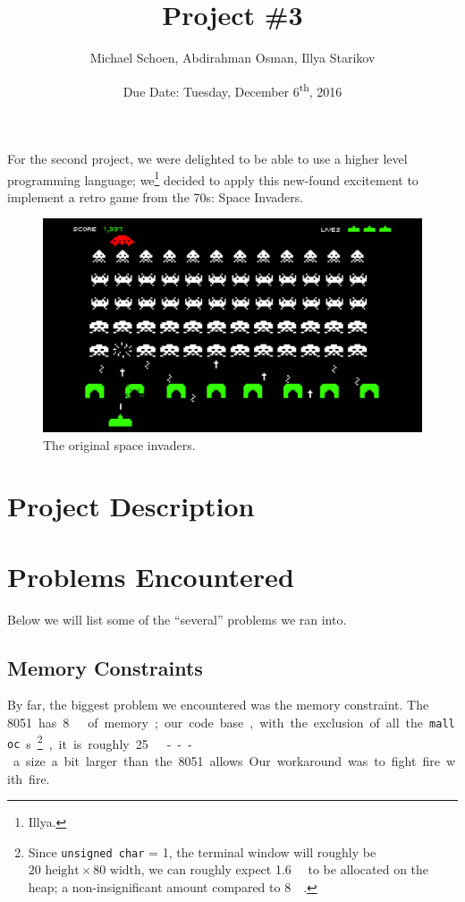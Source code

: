 \documentclass[12pt]{article}
\title{Project \#3}
\date{Due Date: Tuesday, December 6\textsuperscript{th}, 2016}
\author{Michael Schoen, Abdirahman Osman, Illya Starikov}
\newcommand{\shellcmd}[1]{\texttt{\colorbox{gray!30}{#1}}}
\begin{document}
\maketitle

For the second project, we were delighted to be able to use a higher level programming language; we\footnote{Illya.} decided to apply this new-found excitement to implement a retro game from the \num{70}s: Space Invaders.

\begin{figure}[!ht]
    \includegraphics[width=\textwidth]{assets/space-invaders}
    \caption{The original space invaders.}
    \label{space-invaders}
\end{figure}

\section{Project Description}

\section{Problems Encountered}
Below we will list some of the ``several'' problems we ran into.

\subsection{Memory Constraints}
By far, the biggest problem we encountered was the memory constraint. The \SI{8051} has \SI{8}{\kilo\byte} of memory; our code base, with the exclusion of all the \shellcmd{malloc}s\footnote{Since \shellcmd{unsigned char} = \SI{1}{\byte}, the terminal window will roughly be $20\text{ height} \times 80\text{ width} $, we can roughly expect \SI{1.6}{\kilo\byte} to be allocated on the heap; a non-insignificant amount compared to \SI{8}{\kilo\byte}.}, it is roughly \SI{25}{\kilo\byte} --- a size a bit larger than the \num{8051} allows. Our workaround was to fight fire with fire.
\end{document}
